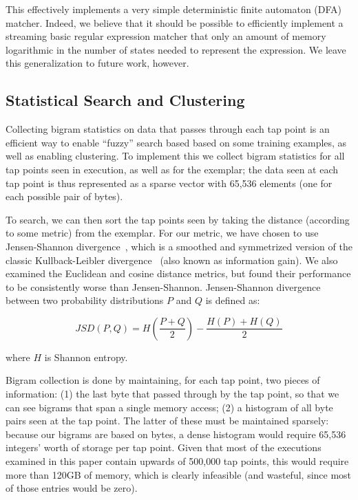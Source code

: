 This effectively implements a very simple deterministic finite automaton
(DFA) matcher. Indeed, we believe that it should be possible to
efficiently implement a streaming basic regular expression matcher that
only an amount of memory logarithmic in the number of states needed to
represent the expression. We leave this generalization to future work,
however.

\subsection{Statistical Search and Clustering}
\label{sec:implementation:subsec:bigram}

Collecting bigram statistics on data that passes through each tap point
is an efficient way to enable ``fuzzy'' search based based on some
training examples, as well as enabling clustering. To implement this
we collect bigram statistics for all tap points seen in execution, as
well as for the exemplar; the data seen at each tap point is thus
represented as a sparse vector with 65,536 elements (one for each
possible pair of bytes).

To search, we can then sort the tap points seen by taking the distance
(according to some metric) from the exemplar. For our metric, we have
chosen to use Jensen-Shannon divergence~\cite{Lin:2006fk}, which is a
smoothed and symmetrized version of the classic Kullback-Leibler
divergence~\cite{Kullback:1951uq} (also known as information gain). We
also examined the Euclidean and cosine distance metrics, but found their
performance to be consistently worse than Jensen-Shannon. Jensen-Shannon
divergence between two probability distributions $P$ and $Q$ is defined
as:

\[
JSD(P, Q) = H \left ( \frac{P+Q}{2} \right ) - \frac{H(P)+H(Q)}{2}
\]

\noindent where $H$ is Shannon entropy.

Bigram collection is done by maintaining, for each tap point, two pieces
of information: (1) the last byte that passed through by the tap point,
so that we can see bigrams that span a single memory access; (2) a
histogram of all byte pairs seen at the tap point. The latter of these
must be maintained sparsely: because our bigrams are based on bytes, a
dense histogram would require 65,536 integers' worth of storage per tap
point. Given that most of the executions examined in this paper contain
upwards of 500,000 tap points, this would require more than 120GB of
memory, which is clearly infeasible (and wasteful, since most of those
entries would be zero).

